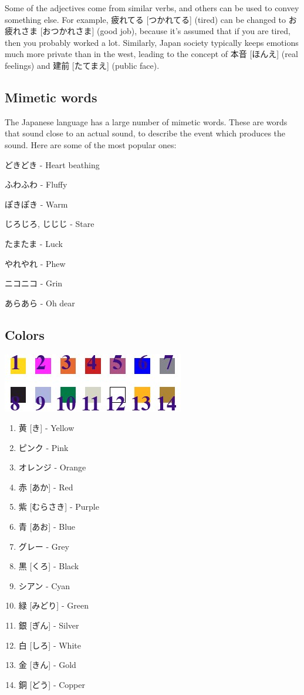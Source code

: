 \documentclass{article}
\begin{document}
\begin{CJK}{UTF8}{min}
\begin{multicols*}{3}
Some of the adjectives come from similar verbs, and others can be used to convey something else. For example, 疲れてる [つかれてる] (tired) can be changed to お疲れさま [おつかれさま] 
(good job), because it's assumed that if you are tired, then you probably worked a lot. Similarly, Japan society typically keeps emotions much more private than in the west, 
leading to the concept of 本音 [ほんえ] (real feelings) and 建前 [たてまえ] (public face).

\subsection{Mimetic words}

The Japanese language has a large number of mimetic words. These are words that sound close to an actual sound, to describe the event which produces the sound. Here are some of the 
most popular ones:

\begin{colorize}
\item どきどき - Heart beathing
\item ふわふわ - Fluffy
\item ぽきぽき - Warm
\item じろじろ, じじじ - Stare
\item たまたま - Luck
\item やれやれ - Phew
\item ニコニコ - Grin
\item あらあら - Oh dear
\end{colorize}

\subsection{Colors}

\includegraphics{colors}

\begin{enumerate}
\item 黄 [き] - Yellow
\item ピンク - Pink
\item オレンジ - Orange
\item 赤 [あか] - Red
\item 紫 [むらさき] - Purple
\item 青 [あお] - Blue
\item グレー - Grey
\item 黒 [くろ] - Black
\item シアン - Cyan
\item 緑 [みどり] - Green
\item 銀 [ぎん] - Silver
\item 白 [しろ] - White
\item 金 [きん] - Gold
\item 銅 [どう] - Copper
\end{enumerate}


\end{multicols*}
\end{CJK}
\end{document}
